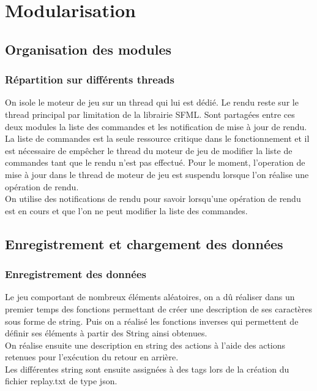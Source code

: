 \chapter{Modularisation}

\section{Organisation des modules}

\subsection{Répartition sur différents threads}

On isole le moteur de jeu sur un thread qui lui est dédié. 
Le rendu reste sur le thread principal par limitation de la
librairie SFML.
Sont partagées entre ces deux modules la liste des commandes et les 
notification de mise à jour de rendu.
\\
La liste de commandes est la seule ressource critique dans le 
fonctionnement et il est nécessaire de empêcher le thread du 
moteur de jeu de modifier la liste de commandes tant que le rendu 
n'est pas effectué. Pour le moment, l'operation de mise à jour dans 
le thread de moteur de jeu est suspendu lorsque l'on réalise une 
opération de rendu.
\\
On utilise des notifications de rendu pour savoir lorsqu'une 
opération de rendu est en cours et que l'on ne peut modifier la 
liste des commandes.



\section{Enregistrement et chargement des données}

\subsection{Enregistrement des données}
Le jeu comportant de nombreux éléments aléatoires, on a dû 
réaliser dans un premier temps des fonctions permettant de 
créer une description de ses caractères sous forme de 
string. Puis on a réalisé les fonctions inverses qui 
permettent de définir ses éléments à partir des String ainsi 
obtenues.
\\
On réalise ensuite une description en string des actions à 
l'aide des actions retenues pour l'exécution du retour en 
arrière.
\\
Les différentes string sont ensuite assignées à des tags 
lors de la création du fichier replay.txt de type json.

